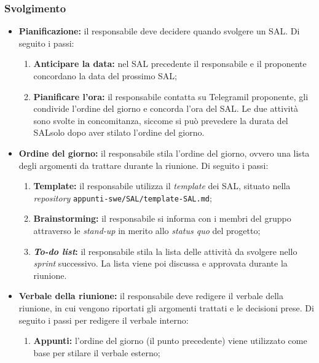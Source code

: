 \subsubsection*{Svolgimento}
\begin{itemize}

	\item \textbf{Pianificazione:} il responsabile deve decidere quando svolgere
	      un SAL\g. Di seguito i passi:
	      \begin{enumerate}
		      \item \textbf{Anticipare la data:} nel SAL\g
		            precedente il responsabile e il proponente concordano
		            la data del prossimo SAL\g;

		      \item \textbf{Pianificare l'ora:} il responsabile contatta su
		            Telegram\g il proponente, gli condivide l'ordine del
		            giorno e concorda l'ora del SAL\g. Le due attività
		            sono svolte in concomitanza, siccome si può prevedere la
		            durata del SAL\g solo dopo aver stilato l'ordine del
		            giorno.
	      \end{enumerate}

	\item \textbf{Ordine del giorno:} il responsabile stila l'ordine del
	      giorno, ovvero una lista degli argomenti da trattare durante la
	      riunione. Di seguito i passi:
	      \begin{enumerate}
		      \item \textbf{Template:} il responsabile utilizza il \textit{template}
		            dei SAL\g, situato nella \textit{repository\g}
		            \texttt{appunti-swe/SAL/template-SAL.md};

		      \item \textbf{Brainstorming:} il responsabile si informa con i
		            membri del gruppo attraverso le \textit{stand-up} in merito
		            allo \textit{status quo} del progetto;

		      \item \textbf{\textit{To-do list}:} il responsabile stila la lista
		            delle attività da svolgere nello \textit{sprint} successivo. La
		            lista viene poi discussa e approvata durante la riunione.
	      \end{enumerate}

	\item \textbf{Verbale della riunione:} il responsabile deve redigere il
	      verbale della riunione, in cui vengono riportati gli argomenti
	      trattati e le decisioni prese. Di seguito i passi per redigere il
	      verbale interno:
	      \begin{enumerate}
		      \item \textbf{Appunti:} l'ordine del giorno (il punto precedente)
		            viene utilizzato come base per stilare il verbale esterno;


\end{enumerate}
\end{itemize}
